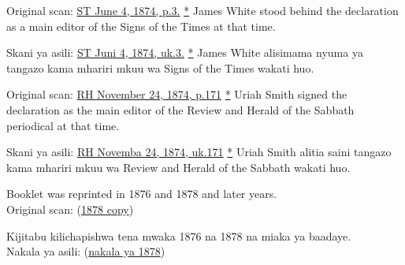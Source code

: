 



Original scan: \href{https://adventistdigitallibrary.org/adl-364148/signs-times-june-4-1874}{ST June 4, 1874, p.3.} \href{https://forgotten-pillar.s3.us-east-2.amazonaws.com/Signs+of+the+Times+_+June+4%2C+1874++.pdf}{*} James White stood behind the declaration as a main editor of the Signs of the Times at that time.


Skani ya asili: \href{https://adventistdigitallibrary.org/adl-364148/signs-times-june-4-1874}{ST Juni 4, 1874, uk.3.} \href{https://forgotten-pillar.s3.us-east-2.amazonaws.com/Signs+of+the+Times+_+June+4%2C+1874++.pdf}{*} James White alisimama nyuma ya tangazo kama mhariri mkuu wa Signs of the Times wakati huo.






Original scan: \href{https://documents.adventistarchives.org/Periodicals/RH/RH18741124-V44-22.pdf}{RH November 24, 1874, p.171} \href{https://forgotten-pillar.s3.us-east-2.amazonaws.com/RH18741124-V44-22.pdf}{*} Uriah Smith signed the declaration as the main editor of the Review and Herald of the Sabbath periodical at that time.


Skani ya asili: \href{https://documents.adventistarchives.org/Periodicals/RH/RH18741124-V44-22.pdf}{RH Novemba 24, 1874, uk.171} \href{https://forgotten-pillar.s3.us-east-2.amazonaws.com/RH18741124-V44-22.pdf}{*} Uriah Smith alitia saini tangazo kama mhariri mkuu wa Review and Herald of the Sabbath wakati huo.






Booklet was reprinted in 1876 and 1878 and later years. \\
Original scan: (\href{https://adventistdigitallibrary.org/islandora/object/adl%3A22250872?solr_nav%5Bid%5D=a09d3902c2540c98eb7f&solr_nav%5Bpage%5D=56&solr_nav%5Boffset%5D=3}{1878 copy})


Kijitabu kilichapishwa tena mwaka 1876 na 1878 na miaka ya baadaye. \\
Nakala ya asili: (\href{https://adventistdigitallibrary.org/islandora/object/adl%3A22250872?solr_nav%5Bid%5D=a09d3902c2540c98eb7f&solr_nav%5Bpage%5D=56&solr_nav%5Boffset%5D=3}{nakala ya 1878})


